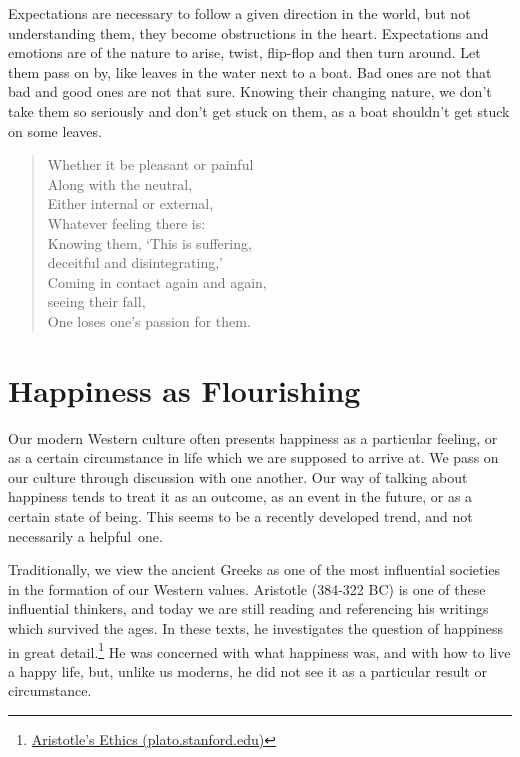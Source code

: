 Expectations are necessary to follow a given direction in the world, but
not understanding them, they become obstructions in the heart.
Expectations and emotions are of the nature to arise, twist, flip-flop
and then turn around. Let them pass on by, like leaves in the water next
to a boat. Bad ones are not that bad and good ones are not that sure.
Knowing their changing nature, we don't take them so seriously and don't
get stuck on them, as a boat shouldn't get stuck on some leaves.

\begin{quote}
Whether it be pleasant or painful\\
Along with the neutral,\\
Either internal or external,\\
Whatever feeling there is:\\
Knowing them, `This is suffering,\\
deceitful and disintegrating,'\\
Coming in contact again and again,\\
seeing their fall,\\
One loses one's passion for them.

\bigskip

\end{quote}

\clearpage

\section{Happiness as Flourishing}


\noindent Our modern Western culture often presents happiness as a
particular feeling, or as a certain circumstance in life which we are
supposed to arrive at. We pass on our culture through discussion with
one another. Our way of talking about happiness tends to treat it as an
outcome, as an event in the future, or as a certain state of being. This
seems to be a recently developed trend, and not necessarily a helpful~one.

Traditionally, we view the ancient Greeks as one of the most influential
societies in the formation of our Western values. Aristotle (384-322 BC)
is one of these influential thinkers, and today we are still reading and
referencing his writings which survived the ages. In these texts, he
investigates the question of happiness in great detail.\footnote{\href{https://plato.stanford.edu/entries/aristotle-ethics/}{Aristotle's
  Ethics (plato.stanford.edu)}} He was concerned with what happiness
was, and with how to live a happy life, but, unlike us moderns, he did
not see it as a particular result or circumstance.

